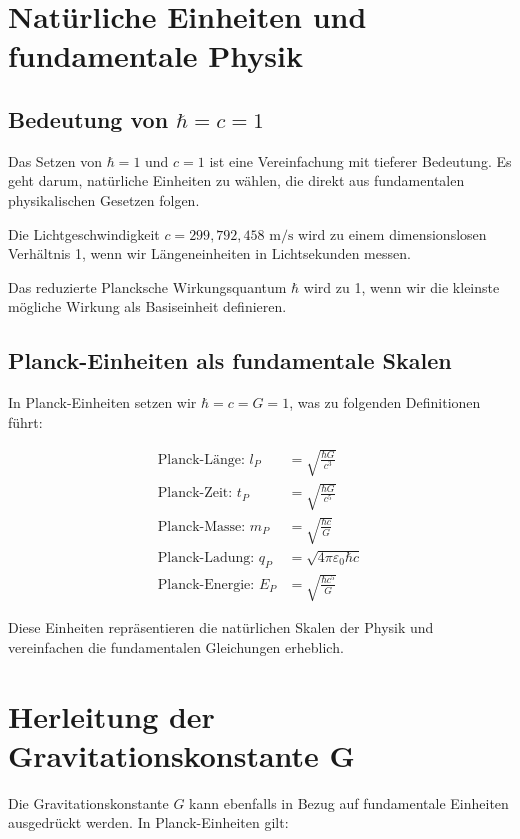 \documentclass{article}
\begin{document}
	\section{Natürliche Einheiten und fundamentale Physik}
	
	\subsection{Bedeutung von $\hbar = c = 1$}
	
	Das Setzen von $\hbar = 1$ und $c = 1$ ist eine Vereinfachung mit tieferer Bedeutung. Es geht darum, natürliche Einheiten zu wählen, die direkt aus fundamentalen physikalischen Gesetzen folgen.
	
	Die Lichtgeschwindigkeit $c = 299,792,458 \text{ m/s}$ wird zu einem dimensionslosen Verhältnis 1, wenn wir Längeneinheiten in Lichtsekunden messen.
	
	Das reduzierte Plancksche Wirkungsquantum $\hbar$ wird zu 1, wenn wir die kleinste mögliche Wirkung als Basiseinheit definieren.
	
	\subsection{Planck-Einheiten als fundamentale Skalen}
	
	In Planck-Einheiten setzen wir $\hbar = c = G = 1$, was zu folgenden Definitionen führt:
	
	\begin{align}
		\text{Planck-Länge: } l_P &= \sqrt{\frac{\hbar G}{c^3}} \\
		\text{Planck-Zeit: } t_P &= \sqrt{\frac{\hbar G}{c^5}} \\
		\text{Planck-Masse: } m_P &= \sqrt{\frac{\hbar c}{G}} \\
		\text{Planck-Ladung: } q_P &= \sqrt{4\pi\varepsilon_0\hbar c} \\
		\text{Planck-Energie: } E_P &= \sqrt{\frac{\hbar c^5}{G}}
	\end{align}
	
	Diese Einheiten repräsentieren die natürlichen Skalen der Physik und vereinfachen die fundamentalen Gleichungen erheblich.
	
	\section{Herleitung der Gravitationskonstante G}
	
	Die Gravitationskonstante $G$ kann ebenfalls in Bezug auf fundamentale Einheiten ausgedrückt werden. In Planck-Einheiten gilt:
	
\end{document}
